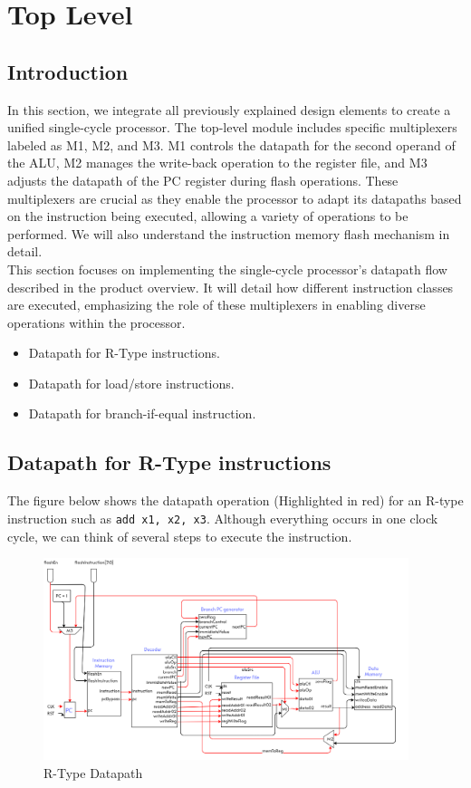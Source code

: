 \newpage
\section{Top Level}

\subsection{Introduction}

In this section, we integrate all previously explained design elements to create a unified single-cycle processor. The top-level module includes specific multiplexers labeled as M1, M2, and M3. M1 controls the datapath for the second operand of the ALU, M2 manages the write-back operation to the register file, and M3 adjusts the datapath of the PC register during flash operations. These multiplexers are crucial as they enable the processor to adapt its datapaths based on the instruction being executed, allowing a variety of operations to be performed. We will also understand the instruction memory flash mechanism in detail.
\\ 
\hfill \break
This section focuses on implementing the single-cycle processor's datapath flow described in the product overview. It will detail how different instruction classes are executed, emphasizing the role of these multiplexers in enabling diverse operations within the processor.
\begin{itemize}
  \item Datapath for R-Type instructions.
  \item Datapath for load/store instructions.
  \item Datapath for branch-if-equal instruction.
\end{itemize}

\subsection{Datapath for R-Type instructions}

The figure below shows the datapath operation (Highlighted in red) for an R-type instruction such as \texttt{add x1, x2, x3}. Although everything occurs in one clock cycle, we can think of several steps to execute the instruction.

\begin{figure}[H]
    \centering
    \includegraphics[width=0.95\textwidth, height=0.4\textheight]{Image/01_Rtype.png}
    \caption{R-Type Datapath}
    \label{fig:R-Type Datapath}
\end{figure}


